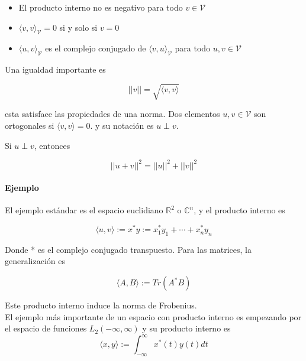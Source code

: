 \begin{itemize}
    \item El producto interno no es negativo para todo $v \in \mathcal{V}$
    \item $\langle v, v \rangle_\mathcal{V} = 0$ si y solo si $v = 0$
    \item $\langle u, v \rangle_\mathcal{V}$ es el complejo conjugado de $\langle v, u \rangle_\mathcal{V}$ para todo $u,v \in \mathcal{V}$
\end{itemize}

Una igualdad importante es 

\begin{equation*}
    ||v|| = \sqrt{\langle v, v \rangle}
\end{equation*}

esta satisface las propiedades de una norma. Dos elementos $u,v \in \mathcal{V}$ son ortogonales si $\langle v, v \rangle = 0$. y su notación es $u \perp v$.

Si $u \perp v$, entonces 

\begin{equation*}
    ||u+v||^{2} = ||u||^2 + ||v||^2
\end{equation*}

\paragraph{Ejemplo} El ejemplo estándar es el espacio euclidiano $\mathbb{R}^2$ o $\mathbb{C}^n$, y el producto interno es

\begin{equation*}
    \langle u, v \rangle := x^{*}y := x_1^{*}y_1 + \cdots + x_n^{*}y_n
\end{equation*}

Donde * es el complejo conjugado transpuesto. Para las matrices, la generalización es

\begin{equation*}
    \langle A, B \rangle := Tr(A^{*}B)
\end{equation*}

Este producto interno induce la norma de Frobenius. \\

El ejemplo más importante de un espacio con producto interno es empezando por el espacio de funciones $L_2(-\infty,\infty)$ y su producto interno es
\begin{equation*}
    \langle x, y \rangle := \int_{-\infty}^{\infty} x^{*}(t)y(t) dt
\end{equation*}

